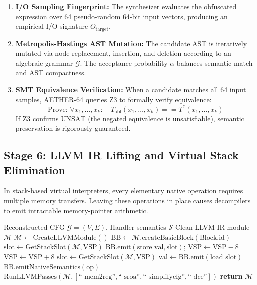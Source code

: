 \documentclass[11pt,a4paper]{article}
\begin{document}
\begin{enumerate}
    \item \textbf{I/O Sampling Fingerprint:} The synthesizer evaluates the obfuscated expression over 64 pseudo-random 64-bit input vectors, producing an empirical I/O signature $O_{\text{target}}$.
    \item \textbf{Metropolis-Hastings AST Mutation:} The candidate AST is iteratively mutated via node replacement, insertion, and deletion according to an algebraic grammar $\mathcal{G}$. The acceptance probability $\alpha$ balances semantic match and AST compactness.
    \item \textbf{SMT Equivalence Verification:} When a candidate matches all 64 input samples, AETHER-64 queries Z3 \cite{z3} to formally verify equivalence:
    \begin{equation}
    \text{Prove: } \forall x_1, \dots, x_k: \quad T_{\text{obf}}(x_1, \dots, x_k) == T^*(x_1, \dots, x_k)
    \end{equation}
    If Z3 confirms $\text{UNSAT}$ (the negated equivalence is unsatisfiable), semantic preservation is rigorously guaranteed.
\end{enumerate}

\subsection{Stage 6: LLVM IR Lifting and Virtual Stack Elimination}
In stack-based virtual interpreters, every elementary native operation requires multiple memory transfers. Leaving these operations in place causes decompilers to emit intractable memory-pointer arithmetic.

\begin{algorithm}[!t]
\caption{SSA Virtual Stack Elimination and LLVM IR Promotion}
\label{alg_llvm}
\begin{algorithmic}[1]
\REQUIRE Reconstructed CFG $\mathcal{G} = (V, E)$, Handler semantics $\mathcal{S}$
\ENSURE Clean LLVM IR module $\mathcal{M}$
\STATE $\mathcal{M} \leftarrow \text{CreateLLVMModule}()$
    \STATE $\text{BB} \leftarrow \mathcal{M}.\text{createBasicBlock}(\text{Block}.\text{id})$
            \STATE $\text{slot} \leftarrow \text{GetStackSlot}(\mathcal{M}, \text{VSP})$
            \STATE $\text{BB}.\text{emit}(\text{store } \text{val}, \text{slot})$; $\text{VSP} \leftarrow \text{VSP} - 8$
            \STATE $\text{VSP} \leftarrow \text{VSP} + 8$
            \STATE $\text{slot} \leftarrow \text{GetStackSlot}(\mathcal{M}, \text{VSP})$
            \STATE $\text{val} \leftarrow \text{BB}.\text{emit}(\text{load } \text{slot})$
        \ELSE
            \STATE $\text{BB}.\text{emitNativeSemantics}(\text{op})$
        \ENDIF
    \ENDFOR
\ENDFOR
\STATE $\text{RunLLVMPasses}(\mathcal{M}, [\text{``-mem2reg''}, \text{``-sroa''}, \text{``-simplifycfg''}, \text{``-dce''}])$
\STATE \textbf{return} $\mathcal{M}$
\end{algorithmic}
\end{algorithm}
\end{document}
